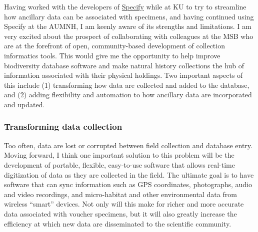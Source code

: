 \documentclass[10pt]{article}
\begin{document}
Having worked with the developers of
\href{https://www.sustain.specifysoftware.org/}{Specify} while at KU to try to
streamline how ancillary data can be associated with specimens,
and having continued using Specify at the AUMNH,
I am keenly aware of its strengths and limitations.
I am very excited about the prospect of collaborating with colleagues at the
MSB who are at the forefront of open, community-based development of collection
informatics tools.
This would give me the opportunity to help improve
biodiversity database software
and make
natural history collections the
hub of information associated with their physical holdings.
Two important aspects of this include (1) transforming how data are
collected and added to the database, and (2) adding flexibility and automation
to how ancillary data are incorporated and updated.

\subsubsection*{Transforming data collection}
Too often, data are lost or corrupted between field collection and database
entry.
Moving forward, I think one important solution to this problem will be the
development of portable, flexible, easy-to-use software that allows real-time
digitization of data as they are collected in the field.
The ultimate goal is to have software that can sync information such as GPS
coordinates, photographs, audio and video recordings, and micro-habitat and
other environmental data from wireless ``smart'' devices.
Not only will this make for richer and more accurate data associated with
voucher specimens, but it will also greatly increase the efficiency at which
new data are disseminated to the scientific community.
\end{document}
